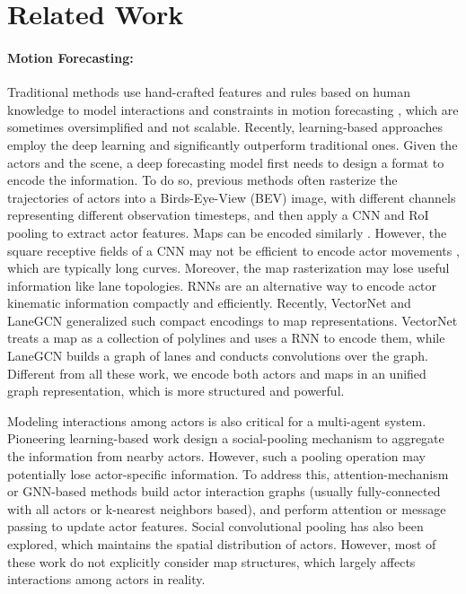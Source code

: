 


\section{Related Work}

\paragraph{Motion Forecasting:}
Traditional methods use hand-crafted features and rules based on human knowledge 
to model interactions and constraints in motion forecasting
\cite{choi2013understanding,choi2012unified,deo2018would,helbing1995social,mehran2009abnormal,yamaguchi2011you,weichiuplay}, which are sometimes oversimplified and not scalable. 
Recently, learning-based approaches employ the deep learning and
significantly outperform traditional ones.
Given the actors and the scene, a deep
forecasting model first needs to design a format to encode the information.
To do so, previous methods \cite{precog,chauffeurnet,covernet} often rasterize
the trajectories of
actors into a Birds-Eye-View (BEV) image, with different channels representing
different observation timesteps, and then apply a CNN and RoI pooling
\cite{fasterrcnn,maskrcnn} to extract actor features. 
Maps can be encoded similarly
\cite{nmp,dsd,intentnet,chauffeurnet,mfp}. 
However, the square receptive fields of a CNN may not be efficient to
encode actor movements \cite{lgn}, which are typically long curves.
Moreover, the map rasterization may lose useful information like lane topologies. 
RNNs are an alternative way to encode actor kinematic information
\cite{matf,mfp,vectornet,tnt,socialgan,sociallstm} compactly and efficiently.
Recently, VectorNet \cite{vectornet} and LaneGCN \cite{lgn} generalized such compact encodings to map representations. 
VectorNet treats a map
as a collection of polylines and uses a RNN to encode them, while LaneGCN builds a
graph of lanes and conducts convolutions over the graph. Different from all these
work, we encode both actors and maps in an unified graph representation, which
is more structured and powerful.


Modeling interactions among actors is also critical for
a multi-agent system. Pioneering learning-based work design a social-pooling mechanism
\cite{sociallstm,socialgan} to aggregate the information from nearby actors.
However, such a 
pooling operation may potentially lose
actor-specific information. To address this,
attention-mechanism \cite{sophie,socialatt,carnet,sun2019relational} or GNN-based
methods \cite{dsd,interacttransformer,lgn,spagnn,precog,mfp,ilvm,vectornet} build actor
interaction graphs (usually fully-connected with all actors or k-nearest
neighbors based),
and perform attention or message passing to update actor features.
Social convolutional pooling \cite{matf,socialconvpool,pip} has also been explored, which maintains the spatial
distribution of actors. 
However, most of these work do not explicitly consider map structures,
which largely affects interactions among actors in reality. 


